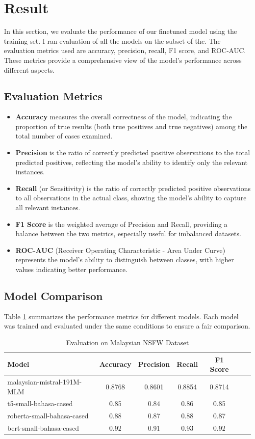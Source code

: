 \documentclass[preprint]{article}
\begin{document}
\section{Result}
In this section, we evaluate the performance of our finetuned model using the training set. I ran evaluation of all the models on the subset of the. The evaluation metrics used are accuracy, precision, recall, F1 score, and ROC-AUC. These metrics provide a comprehensive view of the model's performance across different aspects.

\subsection{Evaluation Metrics}
\begin{itemize}
    \item \textbf{Accuracy} measures the overall correctness of the model, indicating the proportion of true results (both true positives and true negatives) among the total number of cases examined.
    \item \textbf{Precision} is the ratio of correctly predicted positive observations to the total predicted positives, reflecting the model's ability to identify only the relevant instances.
    \item \textbf{Recall} (or Sensitivity) is the ratio of correctly predicted positive observations to all observations in the actual class, showing the model's ability to capture all relevant instances.
    \item \textbf{F1 Score} is the weighted average of Precision and Recall, providing a balance between the two metrics, especially useful for imbalanced datasets.
    \item \textbf{ROC-AUC} (Receiver Operating Characteristic - Area Under Curve) represents the model's ability to distinguish between classes, with higher values indicating better performance.
\end{itemize}

\subsection{Model Comparison}
Table \ref{tab:model_comparison} summarizes the performance metrics for different models. Each model was trained and evaluated under the same conditions to ensure a fair comparison. 

\begin{table}[h]
\centering
\begin{tabular}{lcccccc}
\hline
\textbf{Model} & \textbf{Accuracy} & \textbf{Precision} & \textbf{Recall} & \textbf{F1 Score} \\
\hline
malaysian-mistral-191M-MLM & 0.8768 & 0.8601 & 0.8854 & 0.8714 \\
t5-small-bahasa-cased & 0.85 & 0.84 & 0.86 & 0.85 \\
roberta-small-bahasa-cased & 0.88 & 0.87 & 0.88 & 0.87 \\
bert-small-bahasa-cased & 0.92 & 0.91 & 0.93 & 0.92 \\
\hline
\end{tabular}
\caption{Evaluation on Malaysian NSFW Dataset}
\label{tab:model_comparison}
\end{table}
\end{document}
